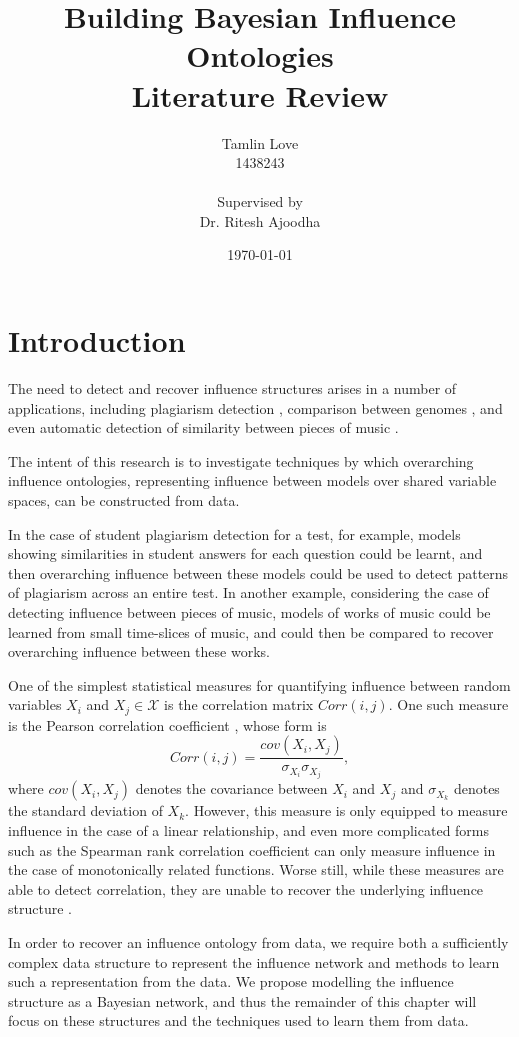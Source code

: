 \documentclass [11pt]{article}
\title{Building Bayesian Influence Ontologies\\Literature Review}
\author{Tamlin Love\\1438243\\\\Supervised by\\Dr. Ritesh Ajoodha}
\date{\today}
\begin{document}
\maketitle
\section{Introduction}
The need to detect and recover influence structures arises in a number of applications, including plagiarism detection \citep{merlo2007}, comparison between genomes \citep{koonin1999}, and even automatic detection of similarity between pieces of music \citep{slaney2008}.

The intent of this research is to investigate techniques by which overarching influence ontologies, representing influence between models over shared variable spaces, can be constructed from data.

In the case of student plagiarism detection for a test, for example, models showing similarities in student answers for each question could be learnt, and then overarching influence between these models could be used to detect patterns of plagiarism across an entire test. In another example, considering the case of detecting influence between pieces of music, models of works of music could be learned from small time-slices of music, and could then be compared to recover overarching influence between these works.

One of the simplest statistical measures for quantifying influence between random variables $X_{i}$ and $X_{j} \in \mathcal{X}$ is the correlation matrix $Corr(i,j)$. One such measure is the Pearson correlation coefficient \citep{pearson1895}, whose form is
\begin{equation*}
Corr(i,j) = \frac{cov(X_{i},X_{j})}{\sigma_{X_{i}} \sigma_{X_{j}}},
\end{equation*}
where $cov(X_{i},X_{j})$ denotes the covariance between $X_{i}$ and $X_{j}$ and $\sigma_{X_{k}}$ denotes the standard deviation of $X_{k}$. However, this measure is only equipped to measure influence in the case of a linear relationship, and even more complicated forms such as the Spearman rank correlation coefficient \citep{spearman1904} can only measure influence in the case of monotonically related functions. Worse still, while these measures are able to detect correlation, they are unable to recover the underlying influence structure \citep{damghani2012}.

In order to recover an influence ontology from data, we require both a sufficiently complex data structure to represent the influence network and methods to learn such a representation from the data. We propose modelling the influence structure as a Bayesian network, and thus the remainder of this chapter will focus on these structures and the techniques used to learn them from data.
\end{document}
